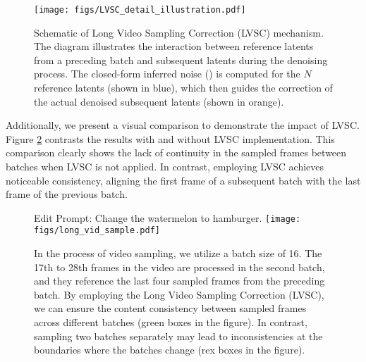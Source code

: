 \begin{figure}
    \centering
    \texttt{[image: figs/LVSC\_detail\_illustration.pdf]}
    \caption{Schematic of Long Video Sampling Correction (LVSC) mechanism. The diagram illustrates the interaction between reference latents from a preceding batch and subsequent latents during the denoising process. The closed-form inferred noise () is computed for the $N$ reference latents (shown in blue), which then guides the correction of the actual denoised subsequent latents (shown in orange).}
    \label{fig.lvsc_detail}
\end{figure}

Additionally, we present a visual comparison to demonstrate the impact of LVSC. Figure \ref{fig.long_vid_sampling} contrasts the results with and without LVSC implementation. This comparison clearly shows the lack of continuity in the sampled frames between batches when LVSC is not applied. In contrast, employing LVSC achieves noticeable consistency, aligning the first frame of a subsequent batch with the last frame of the previous batch.


\begin{figure}
    \centering
    Edit Prompt: Change the watermelon to hamburger.
    \texttt{[image: figs/long\_vid\_sample.pdf]}
    \caption{In the process of video sampling, we utilize a batch size of 16. The 17th to 28th frames in the video are processed in the second batch, and they reference the last four sampled frames from the preceding batch. By employing the Long Video Sampling Correction (LVSC), we can ensure the content consistency between sampled frames across different batches (green boxes in the figure). In contrast, sampling two batches separately may lead to inconsistencies at the boundaries where the batches change  (rex boxes in the figure).}
    \label{fig.long_vid_sampling}
\end{figure}

